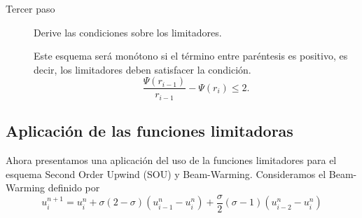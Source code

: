 \begin{description}
	\item[Tercer paso]
	      Derive las condiciones sobre los limitadores.

	      Este esquema será monótono si el término entre paréntesis es
	      positivo, es decir, los limitadores deben satisfacer la
	      condición.
	      \begin{equation*}
		      \frac{\Psi\left(r_{i-1}\right)}{r_{i-1}}-\Psi\left(r_{i}\right)\leq
		      2.
	      \end{equation*}
\end{description}

\subsection{Aplicación de las funciones limitadoras}

Ahora presentamos una aplicación del uso de la funciones limitadores para el esquema
Second Order Upwind (SOU) y Beam-Warming.
Consideramos el Beam-Warming definido por
\begin{equation*}
	u_{i}^{n+1}=
	u_{i}^{n}+
	\sigma(2-\sigma)
	\left(u_{i-1}^n-u_i^n\right)+
	\frac{\sigma}{2}(\sigma-1)
	\left(u_{i-2}^{n}-u_{i}^{n}\right)
\end{equation*}

